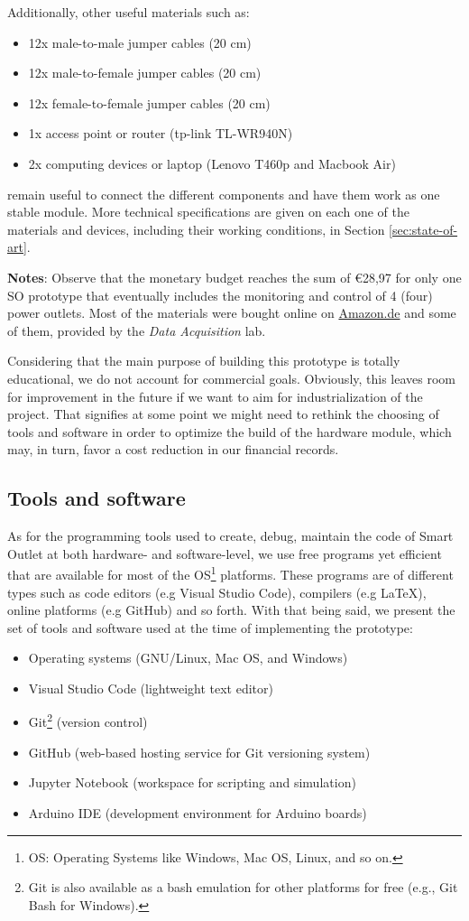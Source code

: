 Additionally, other useful materials such as:
\begin{itemize}
    \item 12x male-to-male jumper cables (20 cm)
    \item 12x male-to-female jumper cables (20 cm)
    \item 12x female-to-female jumper cables (20 cm)
    \item 1x access point or router (tp-link TL-WR940N)
    \item 2x computing devices or laptop (Lenovo T460p and Macbook Air)
\end{itemize}
remain useful to connect the different components and have them work as one stable module. More technical specifications are given on each one of the materials and devices, including their working conditions, in Section \ref{sec:state-of-art}.

\noindent
\textbf{Notes}: Observe that the monetary budget reaches the sum of \euro{28,97} for only one SO prototype that eventually includes the monitoring and control of 4 (four) power outlets. Most of the materials were bought online on \href{https://www.amazon.de/}{Amazon.de} and some of them, provided by the \emph{Data Acquisition} lab.

Considering that the main purpose of building this prototype is totally educational, we do not account for commercial goals. Obviously, this leaves room for improvement in the future if we want to aim for industrialization of the project. That signifies at some point we might need to rethink the choosing of tools and software in order to optimize the build of the hardware module, which may, in turn, favor a cost reduction in our financial records.

\subsection{Tools and software}
As for the programming tools used to create, debug, maintain the code of Smart Outlet at both hardware- and software-level, we use free programs yet efficient that are available for most of the OS\footnote{OS: Operating Systems like Windows, Mac OS, Linux, and so on.} platforms. These programs are of different types such as code editors (e.g Visual Studio Code), compilers (e.g LaTeX), online platforms (e.g GitHub) and so forth. With that being said, we present the set of tools and software used at the time of implementing the prototype:
\begin{itemize}
    \item Operating systems (GNU/Linux, Mac OS, and Windows)
    \item Visual Studio Code (lightweight text editor)
    \item Git\footnote{Git is also available as a bash emulation for other platforms for free (e.g., Git Bash for Windows).} (version control)
    \item GitHub (web-based hosting service for Git versioning system)
    \item Jupyter Notebook (workspace for scripting and simulation)
    \item Arduino IDE (development environment for Arduino boards)
\end{itemize}

